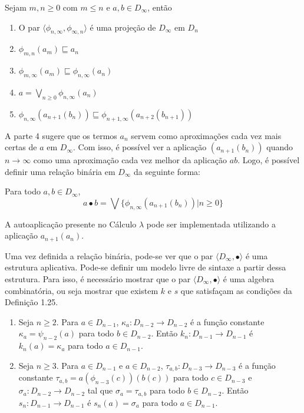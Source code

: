 \documentclass[../main.tex]{subfiles}
\begin{document}
\begin{lemma}
    Sejam $m, n \geq 0$ com $m \leq n$ e $a, b \in D_{\infty}$, então
    \begin{enumerate}
        \item O par $\langle \phi_{n, \infty}, \phi_{\infty, n} \rangle$ é uma projeção de $D_{\infty}$ em $D_n$
        \item $\phi_{m, n} (a_m) \sqsubseteq a_n$
        \item $\phi_{m, \infty} (a_m) \sqsubseteq \phi_{n, \infty} (a_n)$
        \item $a = \bigvee_{n \geq 0} \phi_{n, \infty} (a_n)$
        \item $\phi_{n, \infty} (a_{n+1}(b_n)) \sqsubseteq \phi_{n+1, \infty} (a_{n+2}(b_{n+1}))$
    \end{enumerate}
\end{lemma}

A parte 4 sugere que os termos $a_n$ servem como aproximações cada vez mais certas de $a$ em $D_{\infty}$. Com isso, é possível ver a aplicação $(a_{n+1}(b_n))$ quando $n \to \infty$ como uma aproximação cada vez melhor da aplicação $ab$. Logo, é possível definir uma relação binária em $D_{\infty}$ da seguinte forma:

\begin{definition}
    Para todo $a, b \in D_{\infty}$, 
    $$a \bullet b = \bigvee \{ \phi_{n, \infty} (a_{n+1}(b_n)) | n \geq 0 \}$$
\end{definition}

A autoaplicação presente no Cálculo $\lambda$ pode ser implementada utilizando a aplicação $a_{n+1}(a_n)$.

Uma vez definida a relação binária, pode-se ver que o par $\langle D_{\infty}, \bullet \rangle$ é uma estrutura aplicativa. Pode-se definir um modelo livre de sintaxe a partir dessa estrutura. Para isso, é necessário mostrar que o par $\langle D_{\infty}, \bullet \rangle$ é uma algebra combinatória, ou seja mostrar que existem $k$ e $s$ que satisfaçam as condições da Definição 1.25.

\begin{definition}[$k_n, s_n$]
    \hfil
    \begin{enumerate}
        \item Seja $n \geq 2$. Para $a \in D_{n-1}$, $\kappa_a : D_{n-2} \to D_{n-2}$ é a função constante $\kappa_a = \psi_{n-2}(a)$ para todo $b \in D_{n-2}$. Então $k_n : D_{n-1} \to D_{n-1}$ é $k_n (a) = \kappa_a$ para todo $a \in D_{n-1}$.
        \item  Seja $n \geq 3$. Para $a \in D_{n-1}$ e $a \in D_{n-2}$, $\tau_{a, b} : D_{n-3} \to D_{n-3}$ é a função constante $\tau_{a, b} = a(\phi_{n-3}(c))(b(c))$ para todo $c \in D_{n-3}$ e $\sigma_a : D_{n-2} \to D_{n-2}$ tal que $\sigma_a = \tau_{a, b}$ para todo $b \in D_{n-2}$. Então $s_n : D_{n-1} \to D_{n-1}$ é $s_n (a) = \sigma_a$ para todo $a \in D_{n-1}$.
    \end{enumerate}
\end{definition}
\end{document}
